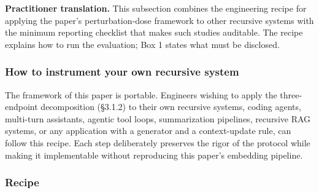 \documentclass{article}
\theoremstyle{plain}
\theoremstyle{definition}
\begin{document}
\textbf{Practitioner translation.} This subsection combines the engineering recipe for applying the paper's perturbation-dose framework to other recursive systems with the minimum reporting checklist that makes such studies auditable. The recipe explains how to run the evaluation; Box 1 states what must be disclosed.

\subsubsection*{How to instrument your own recursive system}

The framework of this paper is portable. Engineers wishing to apply the three-endpoint decomposition (§3.1.2) to their own recursive systems, coding agents, multi-turn assistants, agentic tool loops, summarization pipelines, recursive RAG systems, or any application with a generator and a context-update rule, can follow this recipe. Each step deliberately preserves the rigor of the protocol while making it implementable without reproducing this paper's embedding pipeline.

\subsubsection*{Recipe}
\end{document}
